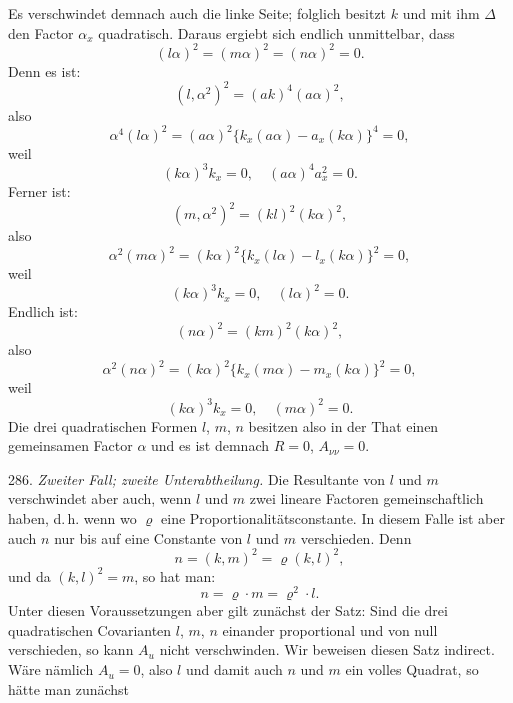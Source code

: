 
Es verschwindet demnach auch die linke Seite; folglich besitzt $k$ und mit ihm $\varDelta$ den Factor $\alpha_x$ quadratisch. Daraus ergiebt sich endlich unmittelbar, dass
\[
(l\alpha)^2=(m\alpha)^2=(n\alpha)^2=0.
\]
Denn es ist:
\[
(l,\alpha^2)^2=(ak)^4(a\alpha)^2,
\]
also
\[
\alpha^4(l\alpha)^2=(a\alpha)^2\{k_x(a\alpha)-a_x(k\alpha)\}^4=0,
\]
weil
\[
(k\alpha)^3k_x=0,\quad (a\alpha)^4a_x^2=0.
\]
Ferner ist:
\[
(m,\alpha^2)^2=(kl)^2(k\alpha)^2,
\]
also
\[
\alpha^2(m\alpha)^2=(k\alpha)^2\{k_x(l\alpha)-l_x(k\alpha)\}^2=0,
\]
weil
\[
(k\alpha)^3k_x=0,\quad (l\alpha)^2=0.
\]
Endlich ist:
\[
(n\alpha)^2=(km)^2(k\alpha)^2,
\]
also
\[
\alpha^2(n\alpha)^2=(k\alpha)^2\{k_x(m\alpha)-m_x(k\alpha)\}^2=0,
\]
weil
\[
(k\alpha)^3k_x=0,\quad (m\alpha)^2=0.
\]
Die drei quadratischen Formen $l$, $m$, $n$ besitzen also in der That einen gemeinsamen Factor $\alpha$ und es ist demnach $R=0$, $A_{\nu\nu}=0$.

286. \textit{Zweiter Fall; zweite Unterabtheilung.} Die Resultante von $l$ und $m$ verschwindet aber auch, wenn $l$ und $m$ zwei lineare Factoren gemeinschaftlich haben, d.\,h. wenn
wo $\varrho$ eine Proportionalitätsconstante. In diesem Falle ist aber auch $n$ nur bis auf eine Constante von $l$ und $m$ verschieden. Denn
\[
n=(k,m)^2=\varrho(k,l)^2,
\]
und da $(k,l)^2=m$, so hat man:
\[
n=\varrho\cdot m=\varrho^2\cdot l.
\]
Unter diesen Voraussetzungen aber gilt zunächst der Satz:
\glqq Sind die drei quadratischen Covarianten $l$, $m$, $n$ einander proportional und von null verschieden, so kann $A_u$ nicht verschwinden.\grqq{}
Wir beweisen diesen Satz indirect. Wäre nämlich $A_u=0$, also $l$ und damit auch $n$ und $m$ ein volles Quadrat, so hätte man zunächst




